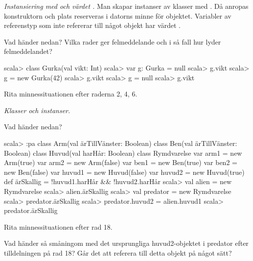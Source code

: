 

\Exercise{\ExeWeekSIX}\label{exe:W06}

\begin{Goals}

\end{Goals}

\begin{Preparations}
\item {}
\end{Preparations}

\BasicTasks %

\Task \emph{Instansiering med  och värdet .} Man skapar instanser av klasser med . Då anropas konstruktorn och plats reserveras i datorns minne för objektet. Variabler av referenstyp som inte refererar till något objekt har värdet . 

\Subtask Vad händer nedan? Vilka rader ger felmeddelande och i så fall hur lyder felmeddelandet?

\begin{REPL}
scala> class Gurka(val vikt: Int)
scala> var g: Gurka = null
scala> g.vikt
scala> g = new Gurka(42)
scala> g.vikt
scala> g = null
scala> g.vikt
\end{REPL}

\Subtask\Pen Rita minnessituationen efter raderna 2, 4, 6.

\Task \emph{Klasser och instanser.} 

\Subtask Vad händer nedan?
\begin{REPL}
scala> :pa
class Arm(val ärTillVänster: Boolean)  
class Ben(val ärTillVänster: Boolean)
class Huvud(val harHår: Boolean)
class Rymdvarelse {
  var arm1 = new Arm(true)
  var arm2 = new Arm(false)
  var ben1 = new Ben(true)
  var ben2 = new Ben(false)
  var huvud1 = new Huvud(false)
  var huvud2 = new Huvud(true)
  def ärSkallig = !huvud1.harHår && !huvud2.harHår
}
scala> val alien = new Rymdvarelse
scala> alien.ärSkallig
scala> val predator = new Rymdvarelse
scala> predator.ärSkallig
scala> predator.huvud2 = alien.huvud1
scala> predator.ärSkallig
\end{REPL}

\Subtask\Pen Rita minnessituationen efter rad 18.

\Subtask\Pen Vad händer så småningom med det ursprungliga huvud2-objektet i predator efter tilldelningen på rad 18? Går det att referera till detta objekt på något sätt?


